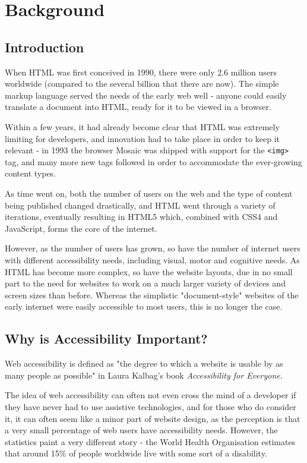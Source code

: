 \documentclass[ %
                    author={Aleena Baig},
                supervisor={Dr Simon Lock},
                    degree={BSc},
                     title={On Making Web Accessible Graphs},
                  subtitle={},
                      year={2019} ]{dissertation}
\begin{document}
\chapter{Background}

\section{Introduction}
When HTML was first conceived in 1990, there were only 2.6 million users worldwide (compared to the several billion that there are now).\cite{ourworldindata:internet} The simple markup language served the needs of the early web well - anyone could easily translate a document into HTML, ready for it to be viewed in a browser.

Within a few years, it had already become clear that HTML was extremely limiting for developers, and innovation had to take place in order to keep it relevant - in 1993 the browser Mosaic was shipped with support for the \texttt{<img>} tag, and many more new tags followed in order to accommodate the ever-growing content types.\cite{historyofhtml}

As time went on, both the number of users on the web and the type of content being published changed drastically, and HTML went through a variety of iterations, eventually resulting in HTML5 which, combined with CSS4 and JavaScript, forms the core of the internet.

However, as the number of users has grown, so have the number of internet users with different accessibility needs, including visual, motor and cognitive needs. As HTML has become more complex, so have the website layouts, due in no small part to the need for websites to work on a much larger variety of devices and screen sizes than before. Whereas the simplistic "document-style" websites of the early internet were easily accessible to most users, this is no longer the case.

\section{Why is Accessibility Important?}

Web accessibility is defined as "the degree to which a
website is usable by as many people as possible" in Laura Kalbag's book \textit{Accessibility for Everyone}.\cite{accessibilityforeveryone}

The idea of web accessibility can often not even cross the mind of a developer if they have never had to use assistive technologies, and for those who do consider it, it can often seem like a minor part of website design, as the perception is that a very small percentage of web users have accessibility needs.
However, the statistics paint a very different story - the World Health Organisation estimates that around 15\% of people worldwide live with some sort of a disability.\cite{WHOdisability}
\end{document}
